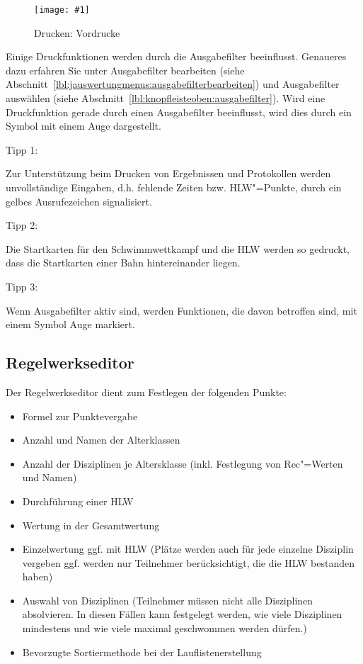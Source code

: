 \documentclass[11pt,a4paper,twoside,ngerman]{article}
\newcommand{\hsmimage}[3]{\begin{figure}[!ht]\centering\texttt{[image: \#1]}\caption{#3}\end{figure}}
\begin{document}
\hsmimage{pics/panel-drucken-vordrucke}{.80\textwidth}{Drucken: Vordrucke}
Einige Druckfunktionen werden durch die Ausgabefilter beeinflusst. Genaueres dazu erfahren Sie unter Ausgabefilter bearbeiten (siehe Abschnitt~\ref{lbl:jauswertungmenus:ausgabefilterbearbeiten}) und Ausgabefilter auswählen (siehe Abschnitt~\ref{lbl:knopfleisteoben:ausgabefilter}). Wird eine Druckfunktion gerade durch einen Ausgabefilter beeinflusst, wird dies durch ein Symbol mit einem Auge dargestellt.

\begin{bfseries}Tipp 1:\end{bfseries} Zur Unterstützung beim Drucken von Ergebnissen und Protokollen werden unvollständige Eingaben, d.h. fehlende Zeiten bzw. HLW"=Punkte, durch ein gelbes Ausrufezeichen signalisiert.

\begin{bfseries}Tipp 2:\end{bfseries} Die Startkarten für den Schwimmwettkampf und die HLW werden so gedruckt, dass die Startkarten einer Bahn hintereinander liegen.

\begin{bfseries}Tipp 3:\end{bfseries} Wenn Ausgabefilter aktiv sind, werden Funktionen, die davon betroffen sind, mit einem Symbol \glqq{}Auge\grqq{} markiert.


\newpage

\subsection{Regelwerkseditor}
\label{lbl:akse::begin}
\label{lbl:akse:akse}Der Regelwerkseditor dient zum Festlegen der folgenden Punkte:


\begin{itemize}

\item Formel zur Punktevergabe


\item Anzahl und Namen der Alterklassen


\item Anzahl der Disziplinen je Altersklasse (inkl. Festlegung von Rec"=Werten und Namen)


\item Durchführung einer HLW


\item Wertung in der Gesamtwertung


\item Einzelwertung ggf. mit HLW (Plätze werden auch für jede einzelne Disziplin vergeben ggf. werden nur Teilnehmer berücksichtigt, die die HLW bestanden haben)


\item Auswahl von Disziplinen (Teilnehmer müssen nicht alle Disziplinen absolvieren. In diesen Fällen kann festgelegt werden, wie viele Disziplinen mindestens und wie viele maximal geschwommen werden dürfen.)


\item Bevorzugte Sortiermethode bei der Lauflistenerstellung


\end{itemize}
\end{document}
